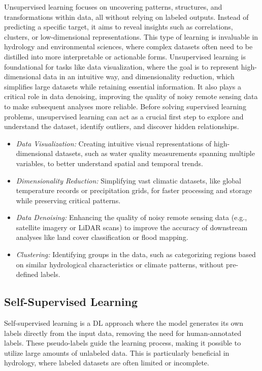 Unsupervised learning focuses on uncovering patterns, structures, and transformations within data, all without relying on labeled outputs. Instead of predicting a specific target, it aims to reveal insights such as correlations, clusters, or low-dimensional representations. This type of learning is invaluable in hydrology and environmental sciences, where complex datasets often need to be distilled into more interpretable or actionable forms. 
Unsupervised learning is foundational for tasks like data visualization, where the goal is to represent high-dimensional data in an intuitive way, and dimensionality reduction, which simplifies large datasets while retaining essential information. It also plays a critical role in data denoising, improving the quality of noisy remote sensing data to make subsequent analyses more reliable. Before solving supervised learning problems, unsupervised learning can act as a crucial first step to explore and understand the dataset, identify outliers, and discover hidden relationships.

\begin{itemize}
    \item \textit{Data Visualization:} Creating intuitive visual representations of high-dimensional datasets, such as water quality measurements spanning multiple variables, to better understand spatial and temporal trends.
    \item \textit{Dimensionality Reduction:} Simplifying vast climatic datasets, like global temperature records or precipitation grids, for faster processing and storage while preserving critical patterns.
    \item \textit{Data Denoising:} Enhancing the quality of noisy remote sensing data (e.g., satellite imagery or LiDAR scans) to improve the accuracy of downstream analyses like land cover classification or flood mapping.
    \item \textit{Clustering:} Identifying groups in the data, such as categorizing regions based on similar hydrological characteristics or climate patterns, without pre-defined labels.

\end{itemize}


\subsection{Self-Supervised Learning}

Self-supervised learning is a DL approach where the model generates its own labels directly from the input data, removing the need for human-annotated labels. These pseudo-labels guide the learning process, making it possible to utilize large amounts of unlabeled data. This is particularly beneficial in hydrology, where labeled datasets are often limited or incomplete.

